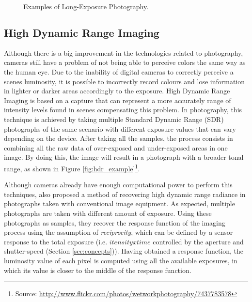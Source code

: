 \begin{figure}[htbp]
        \centering
  \caption{Examples of Long-Exposure Photography. \cite{Kamps2012}}
  \label{fig:long_exposure_example}
\end{figure}

\subsection{High Dynamic Range Imaging}

Although there is a big improvement in the technologies related to photography, cameras still have a problem of not being able to perceive colors the same way as the human eye. Due to the inability of digital cameras to correctly perceive a scenes luminosity, it is possible to incorrectly record colours and lose information in lighter or darker areas accordingly to the exposure. High Dynamic Range Imaging is based on a capture that can represent a more accurately range of intensity levels found in scenes compensating this problem.
In photography, this technique is achieved by taking multiple Standard Dynamic Range (SDR) photographs of the same scenario with different exposure values that can vary depending on the device. After taking all the samples, the process consists in combining all the raw data of over-exposed and under-exposed areas in one image. By doing this, the image will result in a photograph with a broader tonal range, as shown in Figure \ref{fig:hdr_example}\footnote{Source: \url{http://www.flickr.com/photos/wetworkphotography/7437783578}}.

Although cameras already have enough computational power to perform this techniques, \citeauthor{DebevecPaulE.;Malik} \cite{DebevecPaulE.;Malik} also proposed a method of recovering high dynamic range radiance in photographs taken with conventional image equipment. 
As expected, multiple photographs are taken with different amount of exposure. Using these photographs as samples, they recover the response function of the imaging process using the assumption of \emph{reciprocity}, which can be defined by a sensor response to the total exposure (i.e. $itensity x time$ controlled by the aperture and shutter-speed (Section \ref{sec:concepts})).
Having obtained a response function, the luminosity value of each pixel is computed using all the available exposures, in which its value is closer to the middle of the response function.

